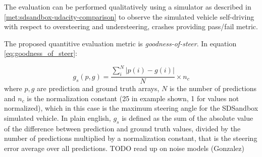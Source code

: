 The evaluation can be performed qualitatively using a simulator as described in \ref{met:sdsandbox-udacity-comparison} to observe the simulated vehicle self-driving with respect to oversteering and understeering, crashes providing pass/fail metric.

The proposed quantitive evaluation metric is \textit{goodness-of-steer}. In equation     \ref{eq:goodness_of_steer}:

\begin{equation}
    \label{eq:goodness_of_steer}
    g_s(p,g) = \frac{\sum_i^N \lvert p(i)-g(i) \rvert }{N} \times n_c
\end{equation}
where $p,g$ are prediction and ground truth arrays,  $N$ is the number of predictions and $n_c$ is the normalization constant (25 in example shown, 1 for values not normalized), which in this case is the maximum steering angle for the SDSandbox simulated vehicle. In plain english, $g_s$ is defined as the sum of the absolute value of the difference between prediction and ground truth values, divided by the number of predictions multiplied by a normalization constant, that is the steering error average over all predictions. 
TODO read up on noise models (Gonzalez)





